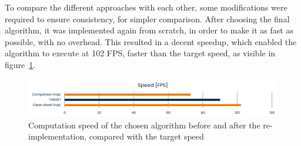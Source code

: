 To compare the different approaches with each other, some modifications were required to ensure consistency, for simpler comparison.
After choosing the final algorithm, it was implemented again from scratch, in order to make it as fast as possible, with no overhead.
This resulted in a decent speedup, which enabled the algorithm to execute at 102 FPS, faster than the target speed, as visible in figure~\ref{fig:locate:speed-cleansheet}.

\begin{figure}
	\centerline{\includegraphics[width=\textwidth]{images/locate-cleansheet-speed.png}}
	\caption{\centering Computation speed of the chosen \locate* algorithm before and after the re-implementation, compared with the target speed}
	\label{fig:locate:speed-cleansheet}
\end{figure}
